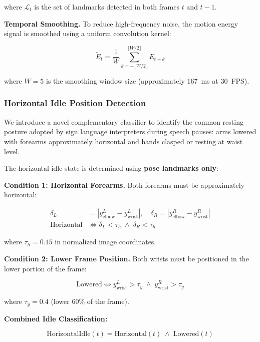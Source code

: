 \documentclass[journal]{IEEEtran}
\begin{document}
where $\mathcal{L}_t$ is the set of landmarks detected in both frames $t$ and $t-1$.

\textbf{Temporal Smoothing.} To reduce high-frequency noise, the motion energy signal is smoothed using a uniform convolution kernel:

\begin{equation}
\tilde{E}_t = \frac{1}{W} \sum_{k=-\lfloor W/2 \rfloor}^{\lfloor W/2 \rfloor} E_{t+k}
\end{equation}

where $W = 5$ is the smoothing window size (approximately 167~ms at 30~FPS).

\subsubsection{Horizontal Idle Position Detection}

We introduce a novel complementary classifier to identify the common resting posture adopted by sign language interpreters during speech pauses: arms lowered with forearms approximately horizontal and hands clasped or resting at waist level.

The horizontal idle state is determined using \textbf{pose landmarks only}:

\textbf{Condition 1: Horizontal Forearms.} Both forearms must be approximately horizontal:

\begin{align}
\delta_L &= |y_{\text{elbow}}^L - y_{\text{wrist}}^L|, \quad \delta_R = |y_{\text{elbow}}^R - y_{\text{wrist}}^R| \\
\text{Horizontal} &\iff \delta_L < \tau_h \;\wedge\; \delta_R < \tau_h
\end{align}

where $\tau_h = 0.15$ in normalized image coordinates.

\textbf{Condition 2: Lower Frame Position.} Both wrists must be positioned in the lower portion of the frame:

\begin{equation}
\text{Lowered} \iff y_{\text{wrist}}^L > \tau_y \;\wedge\; y_{\text{wrist}}^R > \tau_y
\end{equation}

where $\tau_y = 0.4$ (lower 60\% of the frame).

\textbf{Combined Idle Classification:}

\begin{equation}
\text{HorizontalIdle}(t) = \text{Horizontal}(t) \;\wedge\; \text{Lowered}(t)
\end{equation}
\end{document}

